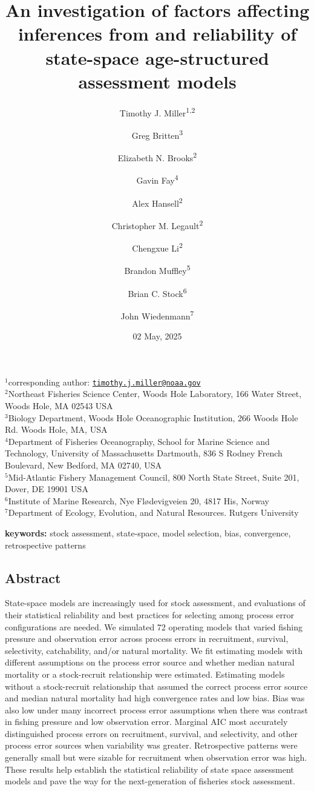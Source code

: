 \documentclass[
  12pt,
]{article}
\title{An investigation of factors affecting inferences from and
reliability of state-space age-structured assessment models}
\author{Timothy J. Miller\textsuperscript{1,2} \and Greg
Britten\textsuperscript{3} \and Elizabeth N.
Brooks\textsuperscript{2} \and Gavin Fay\textsuperscript{4} \and Alex
Hansell\textsuperscript{2} \and Christopher M.
Legault\textsuperscript{2} \and Chengxue
Li\textsuperscript{2} \and Brandon Muffley\textsuperscript{5} \and Brian
C. Stock\textsuperscript{6} \and John Wiedenmann\textsuperscript{7}}
\date{02 May, 2025}
\begin{document}
\maketitle

\(^1\)corresponding author:
\href{mailto:timothy.j.miller@noaa.gov}{\nolinkurl{timothy.j.miller@noaa.gov}}\\
\(^2\)Northeast Fisheries Science Center, Woods Hole Laboratory, 166
Water Street, Woods Hole, MA 02543 USA\\
\(^3\)Biology Department, Woods Hole Oceanographic Institution, 266
Woods Hole Rd. Woods Hole, MA, USA\\
\(^4\)Department of Fisheries Oceanography, School for Marine Science
and Technology, University of Massachusetts Dartmouth, 836 S Rodney
French Boulevard, New Bedford, MA 02740, USA\\
\(^5\)Mid-Atlantic Fishery Management Council, 800 North State Street,
Suite 201, Dover, DE 19901 USA\\
\(^6\)Institute of Marine Research, Nye Flødevigveien 20, 4817 His,
Norway\\
\(^7\)Department of Ecology, Evolution, and Natural Resources. Rutgers
University\\

\pagebreak

\textbf{keywords:} stock assessment, state-space, model selection, bias,
convergence, retrospective patterns

\hypertarget{abstract}{%
\subsection*{Abstract}\label{abstract}}

State-space models are increasingly used for stock assessment, and
evaluations of their statistical reliability and best practices for
selecting among process error configurations are needed. We simulated 72
operating models that varied fishing pressure and observation error
across process errors in recruitment, survival, selectivity,
catchability, and/or natural mortality. We fit estimating models with
different assumptions on the process error source and whether median
natural mortality or a stock-recruit relationship were estimated.
Estimating models without a stock-recruit relationship that assumed the
correct process error source and median natural mortality had high
convergence rates and low bias. Bias was also low under many incorrect
process error assumptions when there was contrast in fishing pressure
and low observation error. Marginal AIC most accurately distinguished
process errors on recruitment, survival, and selectivity, and other
process error sources when variability was greater. Retrospective
patterns were generally small but were sizable for recruitment when
observation error was high. These results help establish the statistical
reliability of state space assessment models and pave the way for the
next-generation of fisheries stock assessment.
\end{document}
